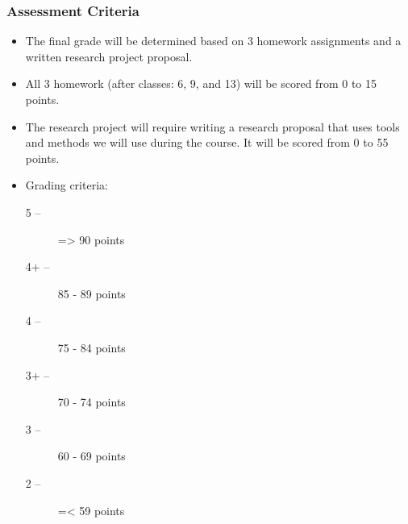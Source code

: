 \documentclass{beamer}
\begin{document}
\begin{frame}
    \frametitle{Assessment Criteria}
    \begin{itemize}
        \item The final grade will be determined based on \alert{3 homework
        assignments} and a \alert{written research project proposal}.
        \item All 3 homework (after classes: 6, 9, and 13) will be scored from 0
        to 15 points.
        \item The research project will require writing a research proposal that
        uses tools and methods we will use during the course. It will be scored
        from 0 to 55 points.
        \item Grading criteria:
    \begin{description}
        \item [5\phantom{+} --] => 90 points
        \item [4+ --] 85 - 89 points
        \item [4\phantom{+} --] 75 - 84 points
        \item [3+ --] 70 - 74 points
        \item [3\phantom{+} --] 60 - 69 points
        \item [2\phantom{+} --] =< 59 points
    \end{description}
\end{itemize}
\end{frame}
\end{document}
